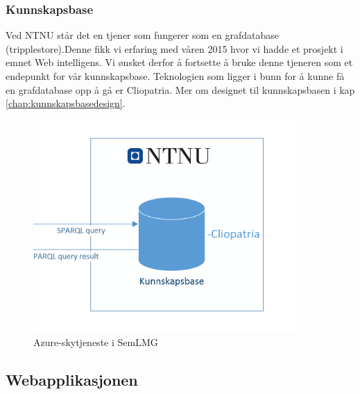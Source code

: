 \subsubsection{Kunnskapsbase}
Ved NTNU står det en tjener som fungerer som en grafdatabase (tripplestore).Denne fikk vi erfaring med våren 2015 hvor vi hadde et prosjekt i emnet Web intelligens. Vi ønsket derfor å fortsette å bruke denne tjeneren som et endepunkt for vår kunnskapsbase. Teknologien som ligger i bunn for å kunne få en grafdatabase opp å gå er Cliopatria. Mer om designet til kunnskapsbasen i kap \ref{chap:kunnskapsbasedesign}.
\begin{figure}[H]
\centering
\includegraphics[width=10cm]{images/pille}
\caption{Azure-skytjeneste i SemLMG}
\label{fig:pille}
\end{figure}

\subsection{Webapplikasjonen}
\label{chap:webapp}
